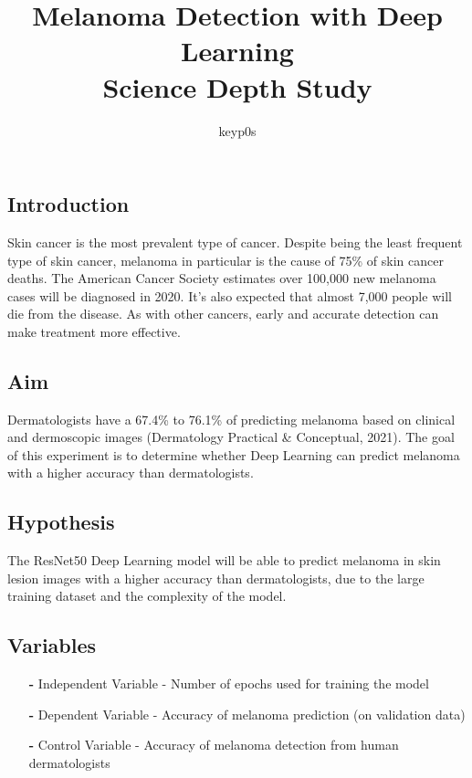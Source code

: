 \documentclass{article}
\begin{document}
\title {\textbf{Melanoma Detection with Deep Learning} \\[1ex] \large Science Depth Study}
\author{keyp0s}
\date{}
\maketitle

\subsection*{Introduction}

Skin cancer is the most prevalent type of cancer. Despite being the least frequent type of skin cancer, melanoma in particular is the cause of 75\% of skin cancer deaths. The American Cancer Society estimates over 100,000 new melanoma cases will be diagnosed in 2020. It's also expected that almost 7,000 people will die from the disease. As with other cancers, early and accurate detection can make treatment more effective.

\subsection*{Aim}

Dermatologists have a 67.4\% to 76.1\% of predicting melanoma based on clinical and dermoscopic images (Dermatology Practical & Conceptual, 2021). The goal of this experiment is to determine whether Deep Learning can predict melanoma with a higher accuracy than dermatologists.

\subsection*{Hypothesis}
The ResNet50 Deep Learning model will be able to predict melanoma in skin lesion images with a higher accuracy than dermatologists, due to the large training dataset and the complexity of the model.

\subsection*{Variables}
\begin{itemize}
\item[\textbf{-}] Independent Variable - Number of epochs used for training the model 
\item[\textbf{-}] Dependent Variable - Accuracy of melanoma prediction (on validation data)
\item[\textbf{-}] Control Variable - Accuracy of melanoma detection from human dermatologists 
\end{itemize}
\end{document}

